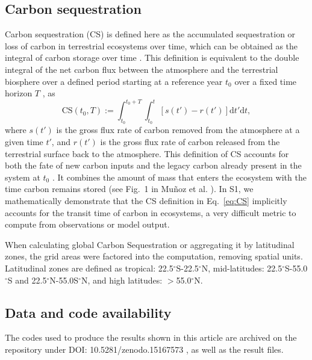\documentclass[9pt,twocolumn,twoside]{pnas-new}
\begin{document}
{\subsection*{Carbon sequestration} 
Carbon sequestration (CS) is defined here as the accumulated sequestration or loss of carbon in terrestrial ecosystems over time, which can be obtained as the integral of carbon storage over time \cite{Sierra2021}. This definition is equivalent to the double integral of the net carbon flux between the atmosphere and the terrestrial biosphere over a defined period starting at a reference year $t_0$ over a fixed time horizon $T$ \citep{Sierra2021,Metzler2024,Sierra2025}, as
\begin{equation} \label{eq:CS}
    \mbox{CS}\left(t_0,T\right):=\int^{t_0+T}_{t_0} \int^{t}_{t_0} \left[s(t')-r(t')\right]\mathrm{d}t'\mathrm{d}t,
\end{equation}
where $s(t')$ is the gross flux rate of carbon removed from the atmosphere at a given time $t'$, and $r(t')$ is the gross flux rate of carbon released from the terrestrial surface back to the atmosphere. This definition of CS accounts for both the fate of new carbon inputs and the legacy carbon already present in the system at $t_0$ \citep{Metzler2024}. It combines the amount of mass that enters the ecosystem with the time carbon remains stored (see Fig.~1 in Muñoz et al. \citep{Munoz2024}). In S1, we mathematically demonstrate that the CS definition in Eq.~\ref{eq:CS} implicitly accounts for the transit time of carbon in ecosystems, a very difficult metric to compute from observations or model output.

When calculating global Carbon Sequestration or aggregating it by latitudinal zones, the grid areas were factored into the computation, removing spatial units. Latitudinal zones are defined as tropical: 22.5$^\circ$S-22.5$^\circ$N, mid-latitudes: 22.5$^\circ$S-55.0$^\circ$S and 22.5$^\circ$N-55.0S$^\circ$N, and high latitudes: $>$55.0$^\circ$N.

\subsection*{Data and code availability} The codes used to produce the results shown in this article are archived on the repository under DOI: 10.5281/zenodo.15167573 \citep{Sierra2025}, as well as the result files.
}


\showmatmethods{} %
\end{document}
